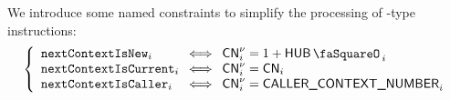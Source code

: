 We introduce some named constraints to simplify the processing of -type instructions:
\[
	\left\{ \begin{array}{lcl}
		\nextContextIsNew      _{i}     & \!\!\! \iff \!\!\! & \cn\new_{i} = 1 + \hubStamp_{i} \\
		\nextContextIsCurrent  _{i}     & \!\!\! \iff \!\!\! & \cn\new_{i} = \cn_{i}           \\
		\nextContextIsCaller   _{i}     & \!\!\! \iff \!\!\! & \cn\new_{i} = \caller_{i}       \\
	\end{array} \right.
\]
